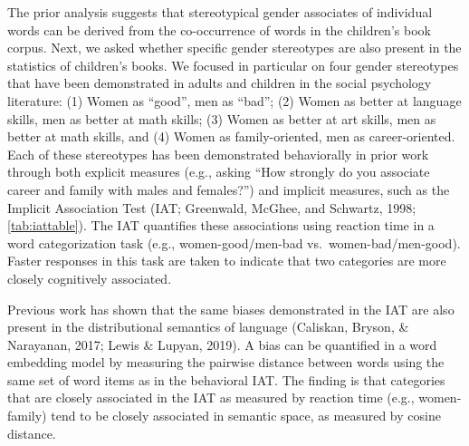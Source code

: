 \documentclass[english,,man,floatsintext]{apa6}
\begin{document}
The prior analysis suggests that stereotypical gender associates of individual words can be derived from the co-occurrence of words in the children's book corpus. Next, we asked whether specific gender stereotypes are also present in the statistics of children's books. We focused in particular on four gender stereotypes that have been demonstrated in adults and children in the social psychology literature: (1) Women as \enquote{good}, men as \enquote{bad}; (2) Women as better at language skills, men as better at math skills; (3) Women as better at art skills, men as better at math skills, and (4) Women as family-oriented, men as career-oriented. Each of these stereotypes has been demonstrated behaviorally in prior work through both explicit measures (e.g., asking \enquote{How strongly do you associate career and family with males and females?}) and implicit measures, such as the Implicit Association Test (IAT; Greenwald, McGhee, and Schwartz, 1998; \autoref{tab:iattable}). The IAT quantifies these associations using reaction time in a word categorization task (e.g., women-good/men-bad vs.~women-bad/men-good). Faster responses in this task are taken to indicate that two categories are more closely cognitively associated.

Previous work has shown that the same biases demonstrated in the IAT are also present in the distributional semantics of language (Caliskan, Bryson, \& Narayanan, 2017; Lewis \& Lupyan, 2019). A bias can be quantified in a word embedding model by measuring the pairwise distance between words using the same set of word items as in the behavioral IAT. The finding is that categories that are closely associated in the IAT as measured by reaction time (e.g., women-family) tend to be closely associated in semantic space, as measured by cosine distance.

\begingroup\fontsize{9}{11}\selectfont
\end{document}
